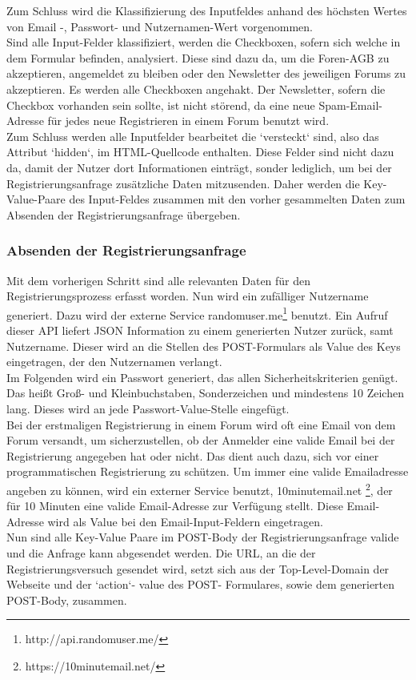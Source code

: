 Zum Schluss wird die Klassifizierung des Inputfeldes anhand des höchsten Wertes von Email -, Passwort- und Nutzernamen-Wert vorgenommen. \\
Sind alle Input-Felder klassifiziert, werden die Checkboxen, sofern sich welche in dem Formular befinden, analysiert. Diese sind dazu da, um die Foren-AGB zu akzeptieren, angemeldet zu bleiben oder den Newsletter des jeweiligen Forums zu akzeptieren.
Es werden alle Checkboxen angehakt. Der Newsletter, sofern die Checkbox vorhanden sein sollte, ist nicht störend, da eine neue Spam-Email-Adresse für jedes neue Registrieren in einem Forum benutzt wird.\\
Zum Schluss werden alle Inputfelder bearbeitet die `versteckt` sind, also das Attribut `hidden`, im HTML-Quellcode enthalten.
Diese Felder sind nicht dazu da, damit der Nutzer dort Informationen einträgt, sonder lediglich, um bei der Registrierungsanfrage zusätzliche Daten mitzusenden. Daher werden die Key-Value-Paare des Input-Feldes zusammen mit den vorher gesammelten Daten zum Absenden der Registrierungsanfrage übergeben.

\subsubsection{Absenden der Registrierungsanfrage}
Mit dem vorherigen Schritt sind alle relevanten Daten für den Registrierungsprozess erfasst worden. Nun wird ein zufälliger Nutzername generiert. Dazu wird der externe Service randomuser.me\footnote{http://api.randomuser.me/} benutzt. Ein Aufruf dieser API liefert JSON Information zu einem generierten Nutzer zurück, samt Nutzername. Dieser wird an die Stellen des POST-Formulars als Value des Keys eingetragen, der den Nutzernamen verlangt.\\
Im Folgenden wird ein Passwort generiert, das allen Sicherheitskriterien genügt. Das heißt Groß- und Kleinbuchstaben, Sonderzeichen und mindestens 10 Zeichen lang. Dieses wird an jede Passwort-Value-Stelle eingefügt.\\
Bei der erstmaligen Registrierung in einem Forum wird oft eine Email von dem Forum versandt, um sicherzustellen, ob der Anmelder eine valide Email bei der Registrierung angegeben hat oder nicht. Das dient auch dazu, sich vor einer programmatischen Registrierung zu schützen. Um immer eine valide Emailadresse angeben zu können, wird ein externer Service benutzt, 10minutemail.net \footnote{https://10minutemail.net/}, der für 10 Minuten eine valide Email-Adresse zur Verfügung stellt. Diese Email-Adresse wird als Value bei den Email-Input-Feldern eingetragen.\\
Nun sind alle Key-Value Paare im POST-Body der Registrierungsanfrage valide und die Anfrage kann abgesendet werden.
Die URL, an die der Registrierungsversuch gesendet wird, setzt sich aus der Top-Level-Domain der Webseite und der `action`- value des POST- Formulares, sowie dem generierten POST-Body, zusammen.

